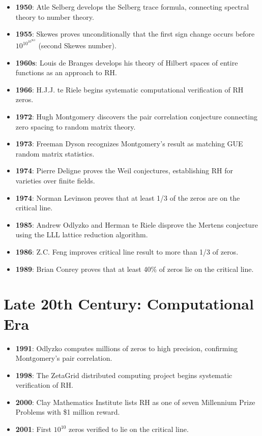 \begin{itemize}
\item \textbf{1950}: Atle Selberg develops the Selberg trace formula, connecting spectral theory to number theory.

\item \textbf{1955}: Skewes proves unconditionally that the first sign change occurs before $10^{10^{10^{963}}}$ (second Skewes number).

\item \textbf{1960s}: Louis de Branges develops his theory of Hilbert spaces of entire functions as an approach to RH.

\item \textbf{1966}: H.J.J. te Riele begins systematic computational verification of RH zeros.

\item \textbf{1972}: Hugh Montgomery discovers the pair correlation conjecture connecting zero spacing to random matrix theory.

\item \textbf{1973}: Freeman Dyson recognizes Montgomery's result as matching GUE random matrix statistics.

\item \textbf{1974}: Pierre Deligne proves the Weil conjectures, establishing RH for varieties over finite fields.

\item \textbf{1974}: Norman Levinson proves that at least 1/3 of the zeros are on the critical line.

\item \textbf{1985}: Andrew Odlyzko and Herman te Riele disprove the Mertens conjecture using the LLL lattice reduction algorithm.

\item \textbf{1986}: Z.C. Feng improves critical line result to more than 1/3 of zeros.

\item \textbf{1989}: Brian Conrey proves that at least 40\% of zeros lie on the critical line.
\end{itemize}

\section*{Late 20th Century: Computational Era}

\begin{itemize}
\item \textbf{1991}: Odlyzko computes millions of zeros to high precision, confirming Montgomery's pair correlation.

\item \textbf{1998}: The ZetaGrid distributed computing project begins systematic verification of RH.

\item \textbf{2000}: Clay Mathematics Institute lists RH as one of seven Millennium Prize Problems with \$1 million reward.

\item \textbf{2001}: First $10^{10}$ zeros verified to lie on the critical line.
\end{itemize}

